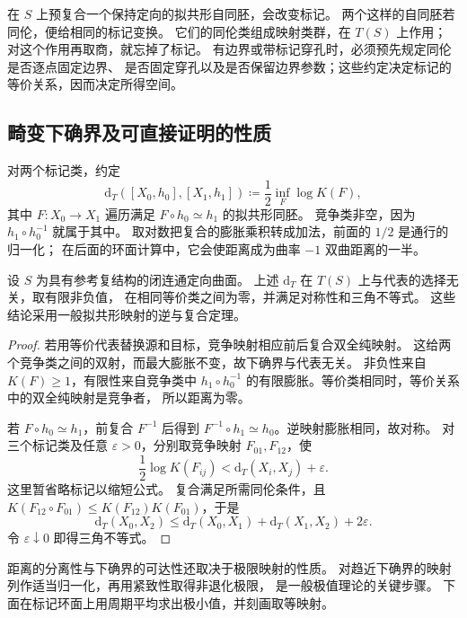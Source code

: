 在 \(S\) 上预复合一个保持定向的拟共形自同胚，会改变标记。
两个这样的自同胚若同伦，便给相同的标记变换。
它们的同伦类组成映射类群，在 \(T(S)\) 上作用；
对这个作用再取商，就忘掉了标记。
有边界或带标记穿孔时，必须预先规定同伦是否逐点固定边界、
是否固定穿孔以及是否保留边界参数；这些约定决定标记的等价关系，因而决定所得空间。

\subsection{畸变下确界及可直接证明的性质}
\label{b3:subsec:B0502}

对两个标记类，约定
\[
 \mathrm d_T([X_0,h_0],[X_1,h_1])
 \coloneqq\frac12\inf_F\log K(F),
\]
其中 \(F:X_0\rightarrow X_1\) 遍历满足
\(F\circ h_0\simeq h_1\) 的拟共形同胚。
竞争类非空，因为 \(h_1\circ h_0^{-1}\) 就属于其中。
取对数把复合的膨胀乘积转成加法，前面的 \(1/2\) 是通行的归一化；
在后面的环面计算中，它会使距离成为曲率 \(-1\) 双曲距离的一半。

\begin{proposition}[距离表达式的基本性质]\label{b3:prop:B-teich-basic}
设 \(S\) 为具有参考复结构的闭连通定向曲面。
上述 \(\mathrm d_T\) 在 \(T(S)\) 上与代表的选择无关，取有限非负值，
在相同等价类之间为零，并满足对称性和三角不等式。
这些结论采用一般拟共形映射的逆与复合定理。
\end{proposition}
\begin{proof}
若用等价代表替换源和目标，竞争映射相应前后复合双全纯映射。
这给两个竞争类之间的双射，而最大膨胀不变，故下确界与代表无关。
非负性来自 \(K(F)\ge1\)，有限性来自竞争类中
\(h_1\circ h_0^{-1}\) 的有限膨胀。等价类相同时，等价关系中的双全纯映射是竞争者，
所以距离为零。

若 \(F\circ h_0\simeq h_1\)，前复合 \(F^{-1}\) 后得到
\(F^{-1}\circ h_1\simeq h_0\)。逆映射膨胀相同，故对称。
对三个标记类及任意 \(\varepsilon>0\)，分别取竞争映射 \(F_{01},F_{12}\)，使
\[
 \frac12\log K(F_{ij})<\mathrm d_T(X_i,X_j)+\varepsilon.
\]
这里暂省略标记以缩短公式。
复合满足所需同伦条件，且 \(K(F_{12}\circ F_{01})\le K(F_{12})K(F_{01})\)，于是
\[
 \mathrm d_T(X_0,X_2)
 \le\mathrm d_T(X_0,X_1)+\mathrm d_T(X_1,X_2)+2\varepsilon.
\]
令 \(\varepsilon\downarrow0\) 即得三角不等式。
\end{proof}
距离的分离性与下确界的可达性还取决于极限映射的性质。
对趋近下确界的映射列作适当归一化，再用紧致性取得非退化极限，
是一般极值理论的关键步骤。
下面在标记环面上用周期平均求出极小值，并刻画取等映射。

